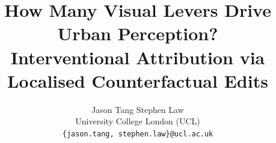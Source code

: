\documentclass[10pt,twocolumn,letterpaper]{article}
\title{How Many Visual Levers Drive Urban Perception?\\
Interventional Attribution via Localised Counterfactual Edits}
\author{
Jason Tang \quad Stephen Law\\
University College London (UCL)\\
{\tt\small \{jason.tang, stephen.law\}@ucl.ac.uk}
}
\begin{document}
\maketitle







{
    \small
    
    
}

\end{document}
